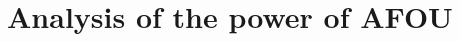 \section{Analysis of the power of AFOU}
\label{analysing-inference}


\begin{comment}
	

\section{Using Statix' first-order unification for inference}



When an \verb|Infer| needs to be type-checked, the logic is very similar, except that we don't need to generate a new metavariable:

\begin{lstlisting}
typeOfExpr_(s, Infer(q)) = (Infer(q), t) :-
	typeOfExpr_(s, q) == (_, t).
\end{lstlisting}
When we encounter a \verb|Infer| in \verb|betaReduceHead|, we keep it intact, because we still want to know that it is a \verb|Infer| in the \verb|expectBetaEq| rule. 

The \verb|expectBetaEq| is where it gets interesting. We have a rule for each constructor in the language. For simple cases like \verb|BoolTrue|, we assert that \verb|e2| must be equal.
\begin{lstlisting}
expectBetaEq_((s1, e1@BoolTrue()), (_, Infer(e2))) :- e1 == e2.
\end{lstlisting}
For more complicated constructors such as \verb|FnType|, we generate new metavariables for the subexpressions, and assert they it must be beta-equal to the provided ones:
\begin{lstlisting}
expectBetaEq_(
	(s1, e1@FnType(arg_name1, arg_type1, body1)), 
	(_, Infer(e2))) :- {arg_type2 body2}
  e2 == FnType(arg_name1, Infer(arg_type2), Infer(body2)),
  expectBetaEq_((s1, e1), (sEmpty(), e2)).
\end{lstlisting}

Finally, there is a case for if we encounter two \verb|Infer|s. Ideally, we would look at whether one infer is instantiated, and apply the rules above. However, this is not possible since we cannot do such queries in Statix. Instead, we say that they must be exactly equal and we hope for the best. There are situations where this rule fails (where e1 and e2 are beta-equal but not identical), but this works well enough for practical use.
\begin{lstlisting}
expectBetaEq_((_, Infer(e1)), (_, Infer(e2))) :-
    e1 == e2.
\end{lstlisting}
\end{comment}